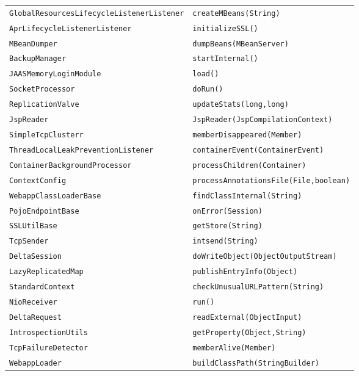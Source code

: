 \begin{center}
\begin{longtable}{ll}
\lstinline/GlobalResourcesLifecycleListenerListener/&{\lstinline/createMBeans(String)/}\\
\lstinline/AprLifecycleListenerListener/&{\lstinline/initializeSSL()/}\\
\lstinline/MBeanDumper/&{\lstinline/dumpBeans(MBeanServer)/}\\
\lstinline/BackupManager/&{\lstinline/startInternal()/}\\
\lstinline/JAASMemoryLoginModule/&{\lstinline/load()/}\\
\lstinline/SocketProcessor/&{\lstinline/doRun()/}\\
\lstinline/ReplicationValve/&{\lstinline/updateStats(long,long)/}\\
\lstinline/JspReader/&{\lstinline/JspReader(JspCompilationContext)/}\\
\lstinline/SimpleTcpClusterr/&{\lstinline/memberDisappeared(Member)/}\\
\lstinline/ThreadLocalLeakPreventionListener/&{\lstinline/containerEvent(ContainerEvent)/}\\
\lstinline/ContainerBackgroundProcessor/&{\lstinline/processChildren(Container)/}\\
\lstinline/ContextConfig/&{\lstinline/processAnnotationsFile(File,boolean)/}\\
\lstinline/WebappClassLoaderBase/&{\lstinline/findClassInternal(String)/}\\
\lstinline/PojoEndpointBase/&{\lstinline/onError(Session)/}\\
\lstinline/SSLUtilBase/&{\lstinline/getStore(String)/}\\
\lstinline/TcpSender/&{\lstinline/intsend(String)/}\\
\lstinline/DeltaSession/&{\lstinline/doWriteObject(ObjectOutputStream)/}\\
\lstinline/LazyReplicatedMap/&{\lstinline/publishEntryInfo(Object)/}\\
\lstinline/StandardContext/&{\lstinline/checkUnusualURLPattern(String)/}\\
\lstinline/NioReceiver/&{\lstinline/run()/}\\
\lstinline/DeltaRequest/&{\lstinline/readExternal(ObjectInput)/}\\
\lstinline/IntrospectionUtils/&{\lstinline/getProperty(Object,String)/}\\
\lstinline/TcpFailureDetector/&{\lstinline/memberAlive(Member)/}\\
\lstinline/WebappLoader/&{\lstinline/buildClassPath(StringBuilder)/}\\

\end{longtable}
\end{center}

